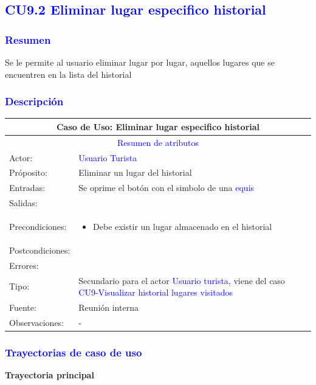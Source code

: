 
\pagebreak
\subsection{\textcolor{blue}{CU9.2 Eliminar lugar especifico historial}}
\subsubsection{\textcolor{blue}{Resumen}}
 Se le permite al usuario eliminar lugar por lugar, aquellos lugares que se encuentren en la lista del historial
\subsubsection{\textcolor{blue}{Descripción}}
\begin{tabularx}{16cm}{||l|X||}
	\hline
	\multicolumn{2}{||c||}{Caso de Uso: Eliminar lugar especifico historial} \\
	\hline
	\multicolumn{2}{||c||}{\textcolor{blue}{Resumen de atributos}} \\
	\hline
	{Actor:} & {\textcolor{blue}{Usuario Turista}} \\
	\hline
	{Próposito:} & {Eliminar un lugar del historial} \\
	\hline
	{Entradas:} & {Se oprime el botón con el simbolo de una \textcolor{blue}{equis}}\\
	\hline
	{Salidas:} & {}\\
	\hline
	{Precondiciones:} & {\begin{itemize}
	    \item Debe existir un lugar almacenado en el historial
	\end{itemize}}\\ 
	\hline
	{Postcondiciones:} & {}\\
	\hline
	{Errores:} & {} \\
	\hline
	{Tipo:} & {Secundario para el actor \textcolor{blue}{Usuario turista}, viene del caso \textcolor{blue}{CU9-Visualizar historial lugares visitados}}\\
	\hline
	{Fuente:} & {Reunión interna} \\
	\hline
	{Observaciones:} & {-} \\
	\hline
\end{tabularx}

\pagebreak
\subsubsection{\textcolor{blue}{Trayectorias de caso de uso}}
\textbf{Trayectoria principal}
    
